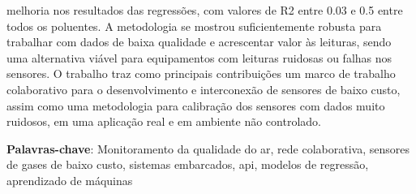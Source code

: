 \begin{resumo}
melhoria nos resultados das regressões, com valores de R2 entre 0.03 e 0.5 entre todos os poluentes. A metodologia se mostrou suficientemente robusta para trabalhar com dados de baixa qualidade e acrescentar valor às leituras, sendo uma alternativa viável para equipamentos com leituras ruidosas ou falhas nos sensores. O trabalho traz como principais contribuições um marco de trabalho colaborativo para o desenvolvimento e interconexão de sensores de baixo custo, assim como uma metodologia para calibração dos sensores com dados muito ruidosos, em uma aplicação real e em ambiente não controlado.
	
	\textbf{Palavras-chave}: Monitoramento da qualidade do ar, rede colaborativa, sensores de gases de baixo custo, sistemas embarcados, \acrshort{api}, modelos de regressão, aprendizado de máquinas
\end{resumo}

